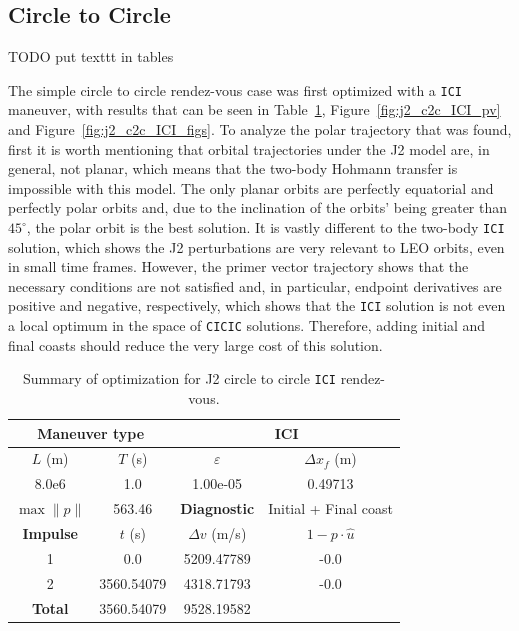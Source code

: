 \subsection{Circle to Circle}

TODO put texttt in tables

The simple circle to circle rendez-vous case was first optimized with a \texttt{ICI} maneuver, with results that can be seen in Table~\ref{tab:j2_c2c_ICI_tab}, Figure~\ref{fig:j2_c2c_ICI_pv} and Figure~\ref{fig:j2_c2c_ICI_figs}. To analyze the polar trajectory that was found, first it is worth mentioning that orbital trajectories under the J2 model are, in general, not planar, which means that the two-body Hohmann transfer is impossible with this model. The only planar orbits are perfectly equatorial and perfectly polar orbits and, due to the inclination of the orbits' being greater than \(45^\circ\), the polar orbit is the best solution. It is vastly different to the two-body \texttt{ICI} solution, which shows the J2 perturbations are very relevant to LEO orbits, even in small time frames. However, the primer vector trajectory shows that the necessary conditions are not satisfied and, in particular, endpoint derivatives are positive and negative, respectively, which shows that the \texttt{ICI} solution is not even a local optimum in the space of \texttt{CICIC} solutions. Therefore, adding initial and final coasts should reduce the very large cost of this solution.

\begin{table}[htpb]
    \centering
    \begin{tabular}{cccc} \toprule
    \multicolumn{2}{c}{\textbf{Maneuver type}} & \multicolumn{2}{c}{ICI} \\ \midrule
    \(L\) (m) & \(T\) (s) & \(\varepsilon\) & \(\Delta x_{f}\) (m)    \\ \midrule
    8.0e6          & 1.0          & 1.00e-05                & 0.49713                        \\ \midrule
    \(\max \lVert p \rVert\) & 563.46     & \textbf{Diagnostic}   & Initial + Final coast        \\ \midrule
    \textbf{Impulse} & \(t\) (s) & \(\Delta v\) (m/s) & \(1 - p \cdot \hat{u}\) \\ \midrule
    1                 & 0.0          & 5209.47789             & -0.0                    \\
    2                 & 3560.54079          & 4318.71793             & -0.0                    \\\midrule
    \textbf{Total}   & 3560.54079          & 9528.19582             &                     \\ \bottomrule   
    \end{tabular}
    \caption{Summary of optimization for J2 circle to circle \texttt{ICI} rendez-vous.}
    \label{tab:j2_c2c_ICI_tab}
\end{table}

